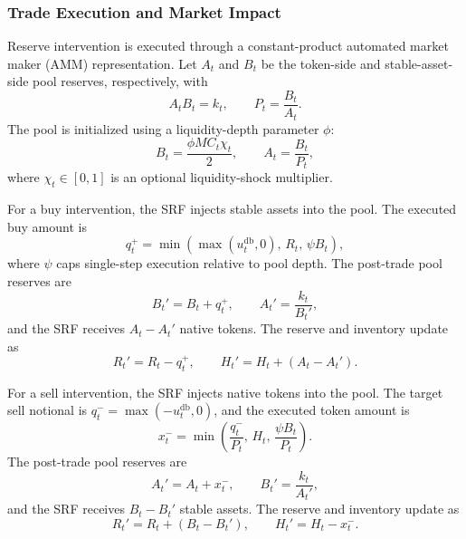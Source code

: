 \documentclass[a4paper,fleqn]{cas-dc}
\begin{document}
\subsubsection{Trade Execution and Market Impact}

Reserve intervention is executed through a constant-product automated market maker (AMM) representation. Let $A_t$ and $B_t$ be the token-side and stable-asset-side pool reserves, respectively, with
\begin{equation}
A_tB_t=k_t,
\qquad
P_t=\frac{B_t}{A_t}.
\label{eq:amm_invariant}
\end{equation}
The pool is initialized using a liquidity-depth parameter $\phi$:
\begin{equation}
B_t=\frac{\phi MC_t \chi_t}{2},
\qquad
A_t=\frac{B_t}{P_t},
\label{eq:pool_depth}
\end{equation}
where $\chi_t\in[0,1]$ is an optional liquidity-shock multiplier.

For a buy intervention, the SRF injects stable assets into the pool. The executed buy amount is
\begin{equation}
q_t^{+}
=
\min
\left(
\max(u_t^{\mathrm{db}},0),\,
R_t,\,
\psi B_t
\right),
\label{eq:buy_amount}
\end{equation}
where $\psi$ caps single-step execution relative to pool depth. The post-trade pool reserves are
\begin{equation}
B_t' = B_t + q_t^{+},
\qquad
A_t' = \frac{k_t}{B_t'},
\label{eq:buy_pool_update}
\end{equation}
and the SRF receives $A_t-A_t'$ native tokens. The reserve and inventory update as
\begin{equation}
R_t' = R_t - q_t^{+},
\qquad
H_t' = H_t + (A_t-A_t').
\label{eq:buy_inventory_update}
\end{equation}

For a sell intervention, the SRF injects native tokens into the pool. The target sell notional is $q_t^{-}=\max(-u_t^{\mathrm{db}},0)$, and the executed token amount is
\begin{equation}
x_t^{-}
=
\min
\left(
\frac{q_t^{-}}{P_t},\,
H_t,\,
\frac{\psi B_t}{P_t}
\right).
\label{eq:sell_amount}
\end{equation}
The post-trade pool reserves are
\begin{equation}
A_t' = A_t + x_t^{-},
\qquad
B_t' = \frac{k_t}{A_t'},
\label{eq:sell_pool_update}
\end{equation}
and the SRF receives $B_t-B_t'$ stable assets. The reserve and inventory update as
\begin{equation}
R_t' = R_t + (B_t-B_t'),
\qquad
H_t' = H_t - x_t^{-}.
\label{eq:sell_inventory_update}
\end{equation}
\end{document}
